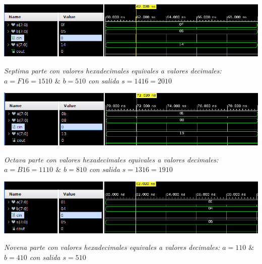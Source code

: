 \documentclass[12pt,executivepaper]{article}
\begin{document}
\begin{flushleft}
	\includegraphics[scale=0.55]{imgs/septima.png}
\end{flushleft}
\begin{center}
    \textit{Septima parte con valores hexadecimales equivales a valores decimales: $a=F{\scriptscriptstyle16}=15{\scriptscriptstyle10}$ $\&$ $b=5{\scriptscriptstyle10}$ con salida $s =14{\scriptscriptstyle16}=20{\scriptscriptstyle10}$}
\end{center}

\begin{flushleft}
	\includegraphics[scale=0.55]{imgs/octava.png}
\end{flushleft}
\begin{center}
    \textit{Octava parte con valores hexadecimales equivales a valores decimales: $a=B{\scriptscriptstyle16}=11{\scriptscriptstyle10}$ $\&$ $b=8{\scriptscriptstyle10}$ con salida $s =13{\scriptscriptstyle16}=19{\scriptscriptstyle10}$}
\end{center}

\begin{flushleft}
	\includegraphics[scale=0.55]{imgs/novena.png}
\end{flushleft}
\begin{center}
    \textit{Novena parte con valores hexadecimales equivales a valores decimales: $a=1{\scriptscriptstyle10}$ $\&$ $b=4{\scriptscriptstyle10}$  con salida $s =5{\scriptscriptstyle10}$}
\end{center}
\end{document}
